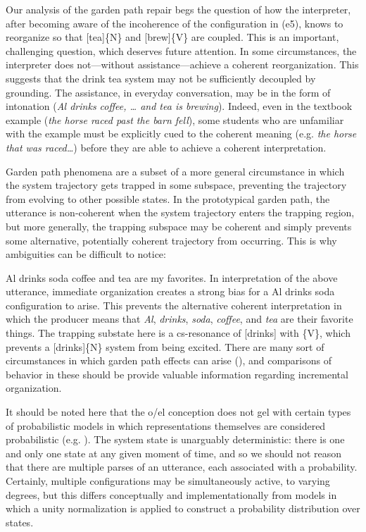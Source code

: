   Our analysis of the garden path repair begs the question of how the interpreter, after becoming aware of the incoherence of the configuration in (e5), knows to reorganize so that [tea]\{N\} and [brew]\{V\} are coupled. This is an important, challenging question, which deserves future attention. In some circumstances, the interpreter does not—without assistance—achieve a coherent reorganization. This suggests that the {\textbar}drink tea{\textbar} system may not be sufficiently decoupled by grounding. The assistance, in everyday conversation, may be in the form of intonation (\textit{Al drinks coffee, … and tea is brewing}). Indeed, even in the textbook example (\textit{the horse raced past the barn fell}), some students who are unfamiliar with the example must be explicitly cued to the coherent meaning (e.g. \textit{the horse that was raced…}) before they are able to achieve a coherent interpretation. 

  Garden path phenomena are a subset of a more general circumstance in which the system trajectory gets trapped in some subspace, preventing the trajectory from evolving to other possible states. In the prototypical garden path, the utterance is non-coherent when the system trajectory enters the trapping region, but more generally, the trapping subspace may be coherent and simply prevents some alternative, potentially coherent trajectory from occurring. This is why ambiguities can be difficult to notice:

  \ea
    {Al drinks soda coffee and tea are my favorites.}
   \z
  In interpretation of the above utterance, immediate organization creates a strong bias for a {\textbar}Al drinks soda{\textbar} configuration to arise. This prevents the alternative coherent interpretation in which the producer means that \textit{Al}, \textit{drinks}, \textit{soda}, \textit{coffee}, and \textit{tea} are their favorite things. The trapping substate here is a cs-resonance of [drinks] with \{V\}, which prevents a [drinks]\{N\} system from being excited. There are many sort of circumstances in which garden path effects can arise (\citealt{FFerreira2005,Pritchett1988}), and comparisons of behavior in these should be provide valuable information regarding incremental organization. 

  It should be noted here that the o/el conception does not gel with certain types of probabilistic models in which representations themselves are considered probabilistic (e.g. \citealt{ChaterManning2006,Manning2003}). The system state is unarguably deterministic: there is one and only one state at any given moment of time, and so we should not reason that there are multiple parses of an utterance, each associated with a probability. Certainly, multiple configurations may be simultaneously active, to varying degrees, but this differs conceptually and implementationally from models in which a unity normalization is applied to construct a probability distribution over states.

